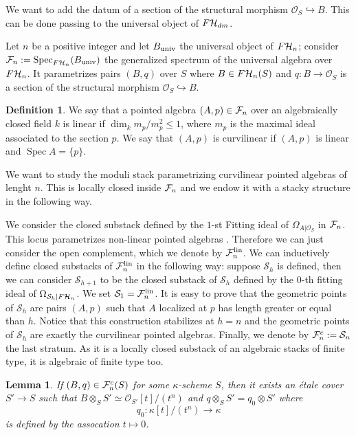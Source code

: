 \documentclass{alggeom}
\numberwithin{equation}{section}
\numberwithin{subsection}{section}
\newtheorem{lemma}[theorem]{Lemma}
\theoremstyle{definition}
\newtheorem{definition}[theorem]{Definition}
\theoremstyle{remark}
\newcommand\cO{\mathcal{O}} \newcommand\cP{\mathcal{P}}
\newcommand\cS{\mathcal{S}} \newcommand\cT{\mathcal{T}}
\newcommand\into{\hookrightarrow}
\newcommand\spec{\operatorname{Spec}}
\begin{document}
We want to add the datum of a section of the structural morphism $\cO_S \into B$. This can be done passing to the universal object of $F\mathcal{H}_{dm}$.

Let $n$ be a positive integer and let $B_{\rm univ}$ the universal object of $F\mathcal{H}_{n}$; consider $\cF_{n}:=\spec_{F\cH_{n}}(B_{\rm univ})$ the generalized spectrum of the universal algebra over $F\mathcal{H}_{n}$. It parametrizes pairs $(B,q)$ over $S$ where $B \in F\mathcal{H}_{n}(S)$ and $q:B \rightarrow \cO_S$ is a section of the structural morphism $\cO_S \into B$. 
\begin{definition}
	We say that a pointed algebra $(A,p) \in \mathcal{F}_n$ over an algebraically closed field $k$ is linear if $\dim_k m_p/m_p^2 \leq 1$, where $m_p$ is the maximal ideal associated to the section $p$. We say that $(A,p)$ is curvilinear if $(A,p)$ is linear and $\spec A=\{p\}$.
\end{definition}

We want to study the moduli stack parametrizing curvilinear pointed algebras of lenght $n$. This is locally closed inside $\mathcal{F}_n$ and we endow it with a stacky structure in the following way.

We consider the closed substack defined by the $1$-st Fitting ideal of $\Omega_{A|\cO_S}$ in $\mathcal{F}_{n}$. This locus parametrizes non-linear pointed algebras . Therefore we can just consider the open complement, which we denote by $\mathcal{F}_{n}^{\rm lin}$. We can inductively define closed substacks of $\mathcal{F}_{n}^{\rm lin}$ in the following way: suppose $\cS_h$ is defined, then we can consider $\cS_{h+1}$ to be the closed substack of $\cS_h$ defined by the $0$-th fitting ideal of $\Omega_{\cS_h|F\cH_{n}}$. We set $\cS_1=\cF_{n}^{\rm lin}$. It is easy to prove that the geometric points of $\cS_h$ are pairs $(A,p)$ such that $A$ localized at $p$ has length greater or equal than $h$. Notice that this construction stabilizes at $h=n$ and the geometric points of $\cS_h$ are exactly the curvilinear pointed algebras. Finally, we denote by $\cF_{n}^{c}:=\cS_{n}$ the last stratum. As it is a locally closed substack of an algebraic stacks of finite type, it is algebraic of finite type too. 

\begin{lemma}\label{lem:loc-triv-alg}
	If $(B,q) \in \mathcal{F}_{n}^c(S)$ for some $\kappa$-scheme $S$, then it exists an \'etale cover $S'\rightarrow S$ such that $B\otimes_S S' \simeq \cO_{S'}[t]/(t^{n})$ and $q\otimes_S S'=q_0\otimes S'$ where
	$$q_0:\kappa[t]/(t^{n}) \longrightarrow \kappa$$
	is defined by the assocation $t\mapsto 0$.
\end{lemma}
\end{document}
